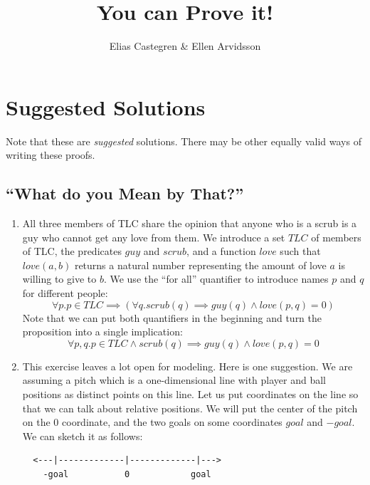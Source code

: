 \documentclass{tufte-handout}
\title[You can Prove it!]{You can Prove it!}
\author{Elias Castegren \& Ellen Arvidsson}
\begin{document}
\section{Suggested Solutions}

Note that these are \emph{suggested} solutions. There may be other
equally valid ways of writing these proofs.

\subsection{``What do you Mean by That?''}

\begin{enumerate}
\item All three members of TLC share the opinion that anyone who
  is a scrub is a guy who cannot get any love from them. We
  introduce a set $\mathit{TLC}$ of members of TLC, the predicates
  $\mathit{guy}$ and $\mathit{scrub}$, and a function
  $\mathit{love}$ such that $\mathit{love}(a, b)$ returns a
  natural number representing the amount of love $a$ is willing to
  give to $b$.
%
  We use the ``for all'' quantifier to introduce names $p$ and $q$
  for different people:
  \[
    \forall p. p \in \mathit{TLC} \implies
    (\forall q. scrub(q) \implies guy(q) \land love(p, q) = 0)
  \]
  Note that we can put both quantifiers in the beginning and turn
  the proposition into a single implication:
  \[
    \forall p, q. p \in \mathit{TLC} \land scrub(q) \implies
    guy(q) \land love(p, q) = 0
  \]
\item This exercise leaves a lot open for modeling. Here is one
  suggestion. We are assuming a pitch which is a one-dimensional
  line with player and ball positions as distinct points on this
  line. Let us put coordinates on the line so that we can talk
  about relative positions.
%
  We will put the center of the pitch on the $0$ coordinate, and
  the two goals on some coordinates $\mathit{goal}$ and
  $-\mathit{goal}$. We can sketch it as follows:

\begin{verbatim}
  <---|-------------|-------------|--->
    -goal           0            goal
\end{verbatim}


\end{enumerate}
\end{document}
